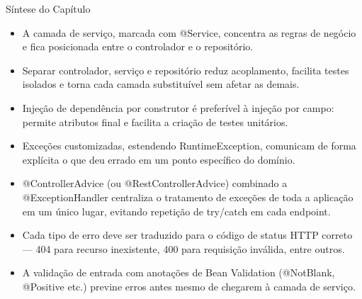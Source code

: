Síntese do Capítulo

\begin{itemize}
  \item A camada de serviço, marcada com @Service, concentra as regras de negócio e fica posicionada entre o controlador e o repositório.
\end{itemize}

\begin{itemize}
  \item Separar controlador, serviço e repositório reduz acoplamento, facilita testes isolados e torna cada camada substituível sem afetar as demais.
\end{itemize}

\begin{itemize}
  \item Injeção de dependência por construtor é preferível à injeção por campo: permite atributos final e facilita a criação de testes unitários.
\end{itemize}

\begin{itemize}
  \item Exceções customizadas, estendendo RuntimeException, comunicam de forma explícita o que deu errado em um ponto específico do domínio.
\end{itemize}

\begin{itemize}
  \item @ControllerAdvice (ou @RestControllerAdvice) combinado a @ExceptionHandler centraliza o tratamento de exceções de toda a aplicação em um único lugar, evitando repetição de try/catch em cada endpoint.
\end{itemize}

\begin{itemize}
  \item Cada tipo de erro deve ser traduzido para o código de status HTTP correto — 404 para recurso inexistente, 400 para requisição inválida, entre outros.
\end{itemize}

\begin{itemize}
  \item A validação de entrada com anotações de Bean Validation (@NotBlank, @Positive etc.) previne erros antes mesmo de chegarem à camada de serviço.
\end{itemize}
